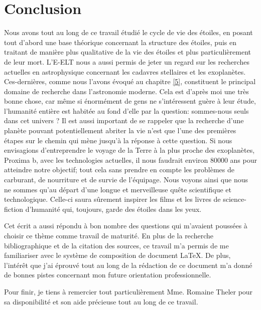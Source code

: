 

\chapter*{Conclusion}


\vfill

Nous avons tout au long de ce travail étudié le cycle de vie des étoiles, en posant tout d'abord une base théorique concernant la structure des étoiles, puis en traitant de manière plus qualitative de la vie des étoiles et plus particulièrement de leur mort. L'E-ELT nous a aussi permis de jeter un regard sur les recherches actuelles en astrophysique concernant les cadavres stellaires et les exoplanètes. Ces-dernières, comme nous l'avons évoqué au chapitre \ref{5}, constituent le principal domaine de recherche dans l'astronomie moderne. Cela est d'après moi une très bonne chose, car même si énormément de gens ne s'intéressent guère à leur étude, l'humanité entière est habitée au fond d'elle par la question: sommes-nous seuls dans cet univers ? Il est aussi important de se rappeler que la recherche d'une planète pouvant potentiellement abriter la vie n'est que l'une des premières étapes sur le chemin qui mène jusqu'à la réponse à cette question. Si nous envisagions d'entreprendre le voyage de la Terre à la plus proche des exoplanètes, Proxima b, avec les technologies actuelles, il nous faudrait environ 80000 ans pour atteindre notre objectif; tout cela sans prendre en compte les problèmes de carburant, de nourriture et de survie de l'équipage. Nous voyons ainsi que nous ne sommes qu'au départ d'une longue et merveilleuse quête scientifique et technologique. Celle-ci saura sûrement inspirer les films et les livres de science-fiction d'humanité qui, toujours, garde des étoiles dans les yeux.\smallskip

Cet écrit a aussi répondu à bon nombre des questions qui m'avaient poussées à choisir ce thème comme travail de maturité. En plus de la recherche bibliographique et de la citation des sources, ce travail m'a permis de me familiariser avec le système de composition de document \LaTeX. De plus, l'intérêt que j'ai éprouvé tout au long de la rédaction de ce document m'a donné de bonnes pistes concernant mon future orientation professionnelle.\bigskip

Pour finir, je tiens à remercier tout particulièrement Mme. Romaine Theler pour sa disponibilité et son aide précieuse tout au long de ce travail.





\vfill